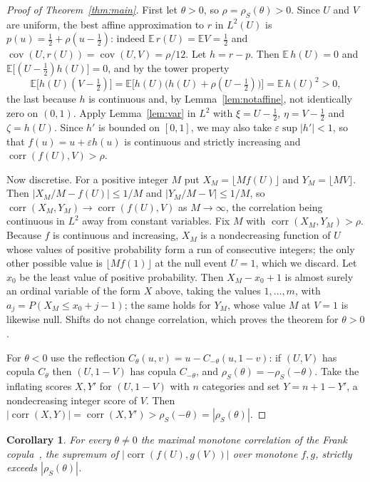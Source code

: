 \documentclass[11pt]{amsart}
\newtheorem{cor}[thm]{Corollary}
\theoremstyle{definition}
\DeclareMathOperator{\corr}{corr}
\DeclareMathOperator{\cov}{cov}
\newcommand{\E}{\mathbb{E}}
\newcommand{\rs}{\rho_S}
\begin{document}
\begin{proof}[Proof of Theorem~\ref{thm:main}]
First let $\theta>0$, so $\rho=\rs(\theta)>0$. Since $U$ and $V$ are uniform, the best affine approximation to $r$ in
$L^2(U)$ is $p(u)=\tfrac12+\rho(u-\tfrac12)$: indeed $\E\,r(U)=\E V=\tfrac12$ and
$\cov(U,r(U))=\cov(U,V)=\rho/12$. Let $h=r-p$. Then $\E\,h(U)=0$ and $\E\bigl[(U-\tfrac12)h(U)\bigr]=0$, and by the
tower property
\[
\E\bigl[h(U)(V-\tfrac12)\bigr]=\E\bigl[h(U)\bigl(h(U)+\rho(U-\tfrac12)\bigr)\bigr]=\E\,h(U)^2>0,
\]
the last because $h$ is continuous and, by Lemma~\ref{lem:notaffine}, not identically zero on $(0,1)$. Apply
Lemma~\ref{lem:var} in $L^2$ with $\xi=U-\tfrac12$, $\eta=V-\tfrac12$ and $\zeta=h(U)$. Since $h'$ is bounded on
$[0,1]$, we may also take $\varepsilon\sup|h'|<1$, so that $f(u)=u+\varepsilon h(u)$ is continuous and strictly
increasing and $\corr(f(U),V)>\rho$.

Now discretise. For a positive integer $M$ put $X_M=\lfloor Mf(U)\rfloor$ and $Y_M=\lfloor MV\rfloor$. Then
$|X_M/M-f(U)|\le1/M$ and $|Y_M/M-V|\le1/M$, so $\corr(X_M,Y_M)\to\corr(f(U),V)$ as $M\to\infty$, the correlation being
continuous in $L^2$ away from constant variables. Fix $M$ with $\corr(X_M,Y_M)>\rho$. Because $f$ is continuous and
increasing, $X_M$ is a nondecreasing function of $U$ whose values of positive probability form a run of
consecutive integers; the only other possible value is $\lfloor Mf(1)\rfloor$ at the null event $U=1$, which we
discard. Let $x_0$ be the least value of positive probability. Then $X_M-x_0+1$ is almost surely an ordinal
variable of the form $X$ above, taking the values $1,\dots,m$, with $a_j=P(X_M\le x_0+j-1)$; the same holds for $Y_M$,
whose value $M$ at $V=1$ is likewise null. Shifts do not change correlation, which proves the theorem
for $\theta>0$.

For $\theta<0$ use the reflection $C_\theta(u,v)=u-C_{-\theta}(u,1-v)$: if $(U,V)$ has copula $C_\theta$ then
$(U,1-V)$ has copula $C_{-\theta}$, and $\rs(\theta)=-\rs(-\theta)$. Take the inflating scores $X,Y'$ for $(U,1-V)$
with $n$ categories and set $Y=n+1-Y'$, a nondecreasing integer score of $V$. Then
$|\corr(X,Y)|=\corr(X,Y')>\rs(-\theta)=|\rs(\theta)|$.
\end{proof}

\begin{cor}
For every $\theta\ne0$ the maximal monotone correlation of the Frank copula~\cite{KS}, the supremum of
$|\corr(f(U),g(V))|$ over monotone $f,g$, strictly exceeds $|\rs(\theta)|$.
\end{cor}
\end{document}
